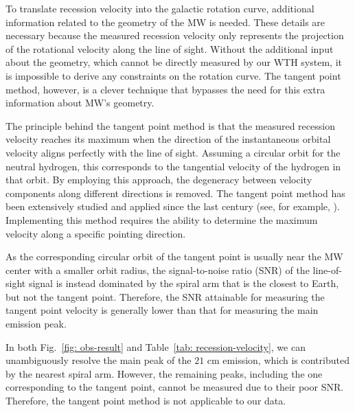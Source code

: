 \documentclass[12pt]{article}
\begin{document}
    To translate recession velocity into the galactic rotation curve, additional information related to the geometry of the MW is needed. 
    These details are necessary because the measured recession velocity only represents the projection of the rotational velocity along the line of sight. 
    Without the additional input about the geometry, which cannot be directly measured by our WTH system, it is impossible to derive any constraints on the rotation curve. The tangent point method, however, is a clever technique that bypasses the need for this extra information about MW's geometry.
    
    The principle behind the tangent point method is that the measured recession velocity reaches its maximum when the direction of the instantaneous orbital velocity aligns perfectly with the line of sight. Assuming a circular orbit for the neutral hydrogen, this corresponds to the tangential velocity of the hydrogen in that orbit. By employing this approach, the degeneracy between velocity components along different directions is removed. 
    The tangent point method has been extensively studied and applied since the last century (see, for example, \cite{tangent-point-method-review,rotation-curve-review,tangent-point-method-systematics,tangent-point-method-systematics-2}). Implementing this method requires the ability to determine the maximum velocity along a specific pointing direction.
    
    As the corresponding circular orbit of the tangent point is usually near the MW center with a smaller orbit radius, the signal-to-noise ratio (SNR) of the line-of-sight signal is instead dominated by the spiral arm that is the closest to Earth, but not the tangent point. 
    Therefore, the SNR attainable for measuring the tangent point velocity is generally lower than that for measuring the main emission peak.
    
    In both Fig.~\ref{fig: obs-result} and Table~\ref{tab: recession-velocity}, we can unambiguously resolve the main peak of the $21$ cm emission, which is contributed by the nearest spiral arm. However, the remaining peaks, including the one corresponding to the tangent point, cannot be measured due to their poor SNR. Therefore, the tangent point method is not applicable to our data.
    
\end{document}
